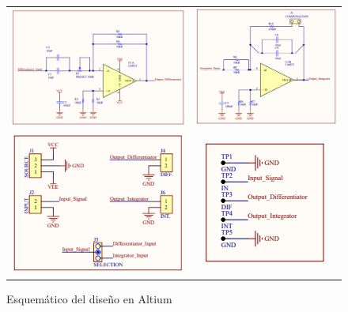 \begin{figure}[H]
	\centering
	\begin{tabular}{c c}
		\includegraphics[scale=0.62]{Recursos/Altium/Derivador_esquematico.png} &
		\includegraphics[scale=0.65]{Recursos/Altium/Integrador_esquematico.png} \\
		\includegraphics[scale=0.7]{Recursos/Altium/Entradas_salidas_esquematico.png} &
		\includegraphics[scale=0.7]{Recursos/Altium/Puntos_prueba_esquematico.png}
	\end{tabular}
	\caption{Esquem\'atico del diseño en Altium}
	\label{fig:altium_sch}
\end{figure}

